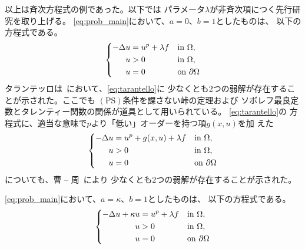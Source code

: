 以上は斉次方程式の例であった。以下では
パラメータ$\lambda$が非斉次項につく先行研究を取り上げる。
\ref{eq:prob_main}において、$a = 0$、$b = 1$としたものは、
以下の方程式である。
\begin{align}
 \left\{
 \begin{aligned}
  -\Delta u &= u^p + \lambda f  & &\text{in}~ \Omega,  \\
  u &> 0 & &\text{in}~ \Omega, \\
  u &= 0 & &\text{on}~ \partial\Omega
 \end{aligned}
 \right. \label{eq:tarantello}
\end{align}
タランテッロは\cite{MR1168304}~において、\eqref{eq:tarantello}に
少なくとも$2$つの弱解が存在することが示された。ここでも
$(\mathrm{PS})$条件を課さない峠の定理および
ソボレフ最良定数とタレンティー関数の関係が道具として用いられている。
\eqref{eq:tarantello}の
方程式に、適当な意味で$p$より「低い」オーダーを持つ項$g(x, u)$を加
えた
\begin{align}
 \left\{
 \begin{aligned}
  -\Delta u &= u^p + g(x, u) + \lambda f  & &\text{in}~ \Omega,  \\
  u &> 0 & &\text{in}~ \Omega, \\
  u &= 0 & &\text{on}~ \partial\Omega
 \end{aligned}
 \right. \label{eq:tarantello2}
\end{align}
についても、曹 -- 周~\cite{MR1408672}により
少なくとも$2$つの弱解が存在することが示された。

\ref{eq:prob_main}において、$a = \kappa$、$b = 1$としたものは、
以下の方程式である。
\begin{align}
 \left\{
 \begin{aligned}
  -\Delta u + \kappa u &= u^p + \lambda f  & &\text{in}~ \Omega,  \\
  u &> 0 & &\text{in}~ \Omega, \\
  u &= 0 & &\text{on}~ \partial\Omega
 \end{aligned}
 \right. \label{eq:naito_sato}
\end{align}

